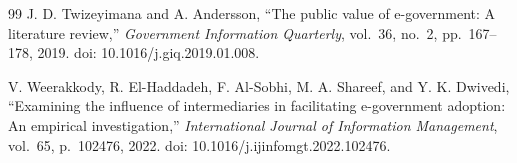 \documentclass[conference]{IEEEtran}
\begin{document}
\begin{thebibliography}{99}
 J. D. Twizeyimana and A. Andersson, ``The public value of e-government: A
literature review,'' \emph{Government Information Quarterly}, vol.~36, no.~2, pp.~167--178, 2019.
doi: 10.1016/j.giq.2019.01.008.

 V. Weerakkody, R. El-Haddadeh, F. Al-Sobhi, M. A. Shareef, and Y. K. Dwivedi,
``Examining the influence of intermediaries in facilitating e-government adoption: An
empirical investigation,'' \emph{International Journal of Information Management}, vol.~65,
p.~102476, 2022. doi: 10.1016/j.ijinfomgt.2022.102476.

\end{thebibliography}
\end{document}
